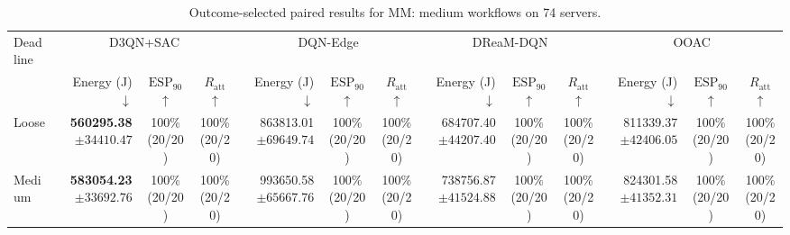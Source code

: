 \begin{table}[!t]
\centering
\caption{Outcome-selected paired results for MM: medium workflows on 74 servers.}
\label{tab:conditional_case_mm}
\begingroup
\footnotesize
\setlength{\tabcolsep}{2.2pt}
\renewcommand{\arraystretch}{1.08}
\begin{tabular}{@{}l*{4}{rcc}@{}}
\toprule
Deadline & \multicolumn{3}{c}{D3QN+SAC} & \multicolumn{3}{c}{DQN-Edge} & \multicolumn{3}{c}{DReaM-DQN} & \multicolumn{3}{c}{OOAC} \\
\cmidrule(lr){2-4}\cmidrule(lr){5-7}\cmidrule(lr){8-10}\cmidrule(lr){11-13}
 & Energy (J) $\downarrow$ & $\mathrm{ESP}_{90}$ $\uparrow$ & $R_{\mathrm{att}}$ $\uparrow$ & Energy (J) $\downarrow$ & $\mathrm{ESP}_{90}$ $\uparrow$ & $R_{\mathrm{att}}$ $\uparrow$ & Energy (J) $\downarrow$ & $\mathrm{ESP}_{90}$ $\uparrow$ & $R_{\mathrm{att}}$ $\uparrow$ & Energy (J) $\downarrow$ & $\mathrm{ESP}_{90}$ $\uparrow$ & $R_{\mathrm{att}}$ $\uparrow$ \\
\midrule
Loose & \shortstack[r]{\textbf{560295.38}\\$\pm 34410.47$} & \shortstack[c]{100\%\\(20/20)} & \shortstack[c]{100\%\\(20/20)} & \shortstack[r]{863813.01\\$\pm 69649.74$} & \shortstack[c]{100\%\\(20/20)} & \shortstack[c]{100\%\\(20/20)} & \shortstack[r]{684707.40\\$\pm 44207.40$} & \shortstack[c]{100\%\\(20/20)} & \shortstack[c]{100\%\\(20/20)} & \shortstack[r]{811339.37\\$\pm 42406.05$} & \shortstack[c]{100\%\\(20/20)} & \shortstack[c]{100\%\\(20/20)} \\
Medium & \shortstack[r]{\textbf{583054.23}\\$\pm 33692.76$} & \shortstack[c]{100\%\\(20/20)} & \shortstack[c]{100\%\\(20/20)} & \shortstack[r]{993650.58\\$\pm 65667.76$} & \shortstack[c]{100\%\\(20/20)} & \shortstack[c]{100\%\\(20/20)} & \shortstack[r]{738756.87\\$\pm 41524.88$} & \shortstack[c]{100\%\\(20/20)} & \shortstack[c]{100\%\\(20/20)} & \shortstack[r]{824301.58\\$\pm 41352.31$} & \shortstack[c]{100\%\\(20/20)} & \shortstack[c]{100\%\\(20/20)} \\

\end{tabular}
\end{table}
